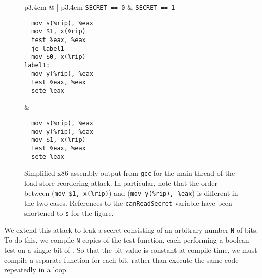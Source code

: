 \begin{figure}
  \begin{tabular}{p{3.4cm} @{\quad} | p{3.4cm}}
    \texttt{SECRET == 0} & \texttt{SECRET == 1} \\ \hline
\begin{verbatim}
  mov s(%rip), %eax
  mov $1, x(%rip)
  test %eax, %eax
  je label1
  mov $0, x(%rip)
label1:
  mov y(%rip), %eax
  test %eax, %eax
  sete %eax
\end{verbatim}
  &
\begin{verbatim}
  mov s(%rip), %eax
  mov y(%rip), %eax
  mov $1, x(%rip)
  test %eax, %eax
  sete %eax
\end{verbatim}
  \end{tabular}
  \caption{
    Simplified x86 assembly output from \texttt{gcc} for the main thread of
    the load-store reordering attack.
    In particular, note that the order between (\texttt{mov \$1, x(\%rip)})
    and (\texttt{mov y(\%rip), \%eax}) is different in the two cases.
    References to the \texttt{canReadSecret} variable have been shortened to
    \texttt{s} for the figure.
  }
  \label{fig:lsr-asm}
\end{figure}

We extend this attack to leak a secret consisting of an arbitrary number
\verb|N| of bits.
To do this, we compile \verb|N| copies of the test function, each
performing a boolean test on a single bit of {\SEC}.
So that the bit value is
constant at compile time, we must compile a separate function for each bit, rather than execute the same
code repeatedly in a loop.

